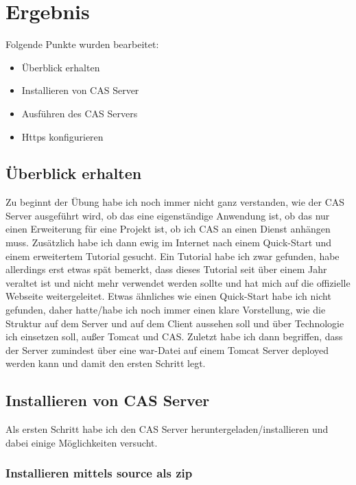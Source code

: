 
\section{Ergebnis}
\label{sec:Ergebnis}

Folgende Punkte wurden bearbeitet:

\begin{itemize}
	\item Überblick erhalten
	\item Installieren von CAS Server
	\item Ausführen des CAS Servers
	\item Https konfigurieren
\end{itemize}

\subsection{Überblick erhalten}

Zu beginnt der Übung habe ich noch immer nicht ganz verstanden, wie der CAS Server ausgeführt wird, ob das eine eigenständige Anwendung ist, ob das nur einen Erweiterung für eine Projekt ist, ob ich CAS an einen Dienst anhängen muss.
\newline
Zusätzlich habe ich dann ewig im Internet nach einem Quick-Start und einem erweitertem Tutorial gesucht. Ein Tutorial habe ich zwar gefunden, habe allerdings erst etwas spät bemerkt, dass dieses Tutorial seit über einem Jahr veraltet ist und nicht mehr verwendet werden sollte und hat mich auf die offizielle Webseite weitergeleitet. Etwas ähnliches wie einen Quick-Start habe ich nicht gefunden, daher hatte/habe ich noch immer einen klare Vorstellung, wie die Struktur auf dem Server und auf dem Client aussehen soll und über Technologie ich einsetzen soll, außer Tomcat und CAS.
\newline 
Zuletzt habe ich dann begriffen, dass der Server zumindest über eine war-Datei auf einem Tomcat Server deployed werden kann und damit den ersten Schritt legt.

\subsection{Installieren von CAS Server}

Als ersten Schritt habe ich den CAS Server heruntergeladen/installieren und dabei einige Möglichkeiten versucht.

\subsubsection{Installieren mittels source als zip}

